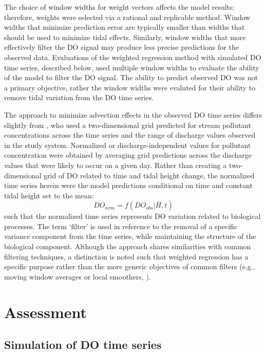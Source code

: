 \documentclass[letterpaper,12pt,oneside]{article}\usepackage[]{graphicx}\usepackage[]{color}
\begin{document}
The choice of window widths for weight vectors affects the model results; therefore, weights were selected via a rational and replicable method.  Window widths that minimize prediction error are typically smaller than widths that should be used to minimize tidal effects.  Similarly, window widths that more effectively filter the \ac{DO} signal may produce less precise predictions for the observed data.  Evaluations of the weighted regression method with simulated \ac{DO} time series, described below, used multiple window widths to evaluate the ability of the model to filter the \ac{DO} signal.  The ability to predict observed \ac{DO} was not a primary objective, rather the window widths were evaluted for their ability to remove tidal variation from the \ac{DO} time series.  

The approach to minimize advection effects in the observed \ac{DO} time series differs slightly from \citet{Hirsch10}, who used a two-dimensional grid predicted for stream pollutant concentrations across the time series and the range of discharge values observed in the study system.  Normalized or discharge-independent values for pollutant concentration were obtained by averaging grid predictions across the discharge values that were likely to occur on a given day.  Rather than creating a two-dimensional grid of \ac{DO} related to time and tidal height change, the normalized time series herein were the model predictions conditional on time and constant tidal height set to the mean:
\begin{equation} \label{do_nrm}
DO_{nrm} = f(DO_{obs}|\bar{H}, t)
\end{equation}
such that the normalized time series represents \ac{DO} variation related to biological processes.  The term `filter' is used in reference to the removal of a specific variance component from the time series, while maintaining the structure of the biological component.  Although the approach shares similarities with common filtering techniques, a distinction is noted such that weighted regression has a specific purpose rather than the more generic objectives of common filters (e.g., moving window averages or local smoothers, \citealt{Shumway11}).     

\section{Assessment}

\subsection{Simulation of \ac{DO} time series}
\end{document}
